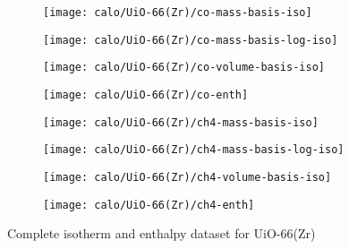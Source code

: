 \begin{figure}[H]
    \begin{subfigure}{0.25\textwidth}
        \texttt{[image: calo/UiO-66(Zr)/co-mass-basis-iso]}%
        \label{appx:fgr:shaping:uio66comass}
    \end{subfigure}%
    \begin{subfigure}{0.25\textwidth}
        \texttt{[image: calo/UiO-66(Zr)/co-mass-basis-log-iso]}%
        \label{appx:fgr:shaping:uio66comasslog}
    \end{subfigure}%
    \begin{subfigure}{0.25\textwidth}
        \texttt{[image: calo/UiO-66(Zr)/co-volume-basis-iso]}%
        \label{appx:fgr:shaping:uio66covolume}
    \end{subfigure}%
    \begin{subfigure}{0.25\textwidth}
        \texttt{[image: calo/UiO-66(Zr)/co-enth]}%
        \label{appx:fgr:shaping:uio66coenth}%
    \end{subfigure}%

    \begin{subfigure}{0.25\textwidth}
        \texttt{[image: calo/UiO-66(Zr)/ch4-mass-basis-iso]}%
        \label{appx:fgr:shaping:uio66ch4mass}
    \end{subfigure}%
    \begin{subfigure}{0.25\textwidth}
        \texttt{[image: calo/UiO-66(Zr)/ch4-mass-basis-log-iso]}%
        \label{appx:fgr:shaping:uio66ch4masslog}
    \end{subfigure}%
    \begin{subfigure}{0.25\textwidth}
        \texttt{[image: calo/UiO-66(Zr)/ch4-volume-basis-iso]}%
        \label{appx:fgr:shaping:uio66ch4volume}
    \end{subfigure}%
    \begin{subfigure}{0.25\textwidth}
        \texttt{[image: calo/UiO-66(Zr)/ch4-enth]}%
        \label{appx:fgr:shaping:uio66ch4enth}%
    \end{subfigure}%

    \caption{Complete isotherm and enthalpy dataset for UiO-66(Zr)}
\end{figure}

